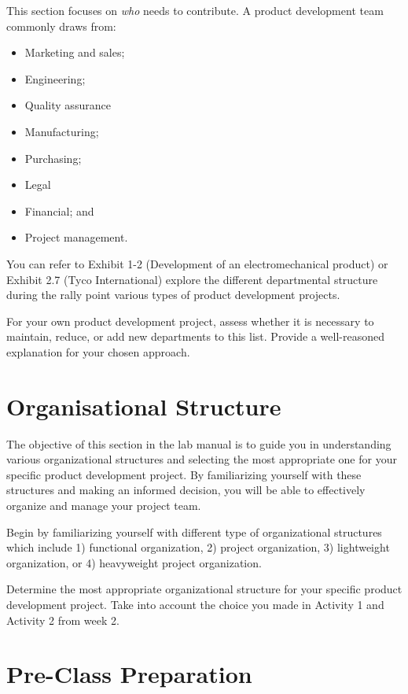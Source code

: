 This section focuses on \emph{who} needs to contribute. A product development team commonly draws from:
\begin{itemize}
    \item Marketing and sales;
    \item Engineering;
    \item Quality assurance
    \item Manufacturing;
    \item Purchasing;
    \item Legal
    \item Financial; and
    \item Project management.
\end{itemize}

You can refer to Exhibit 1-2 (Development of an electromechanical product) or Exhibit 2.7 (Tyco International) explore the different departmental structure during the rally point various types of product development projects.


For your own product development project, assess whether it is necessary to maintain, reduce, or add new departments to this list. Provide a well-reasoned explanation for your chosen approach.




\section{Organisational Structure}

The objective of this section in the lab manual is to guide you in understanding various organizational structures and selecting the most appropriate one for your specific product development project. By familiarizing yourself with these structures and making an informed decision, you will be able to effectively organize and manage your project team.

Begin by familiarizing yourself with different type of organizational structures which include 1) functional organization, 2) project organization, 3) lightweight organization, or 4) heavyweight project organization.

Determine the most appropriate organizational structure for your specific product development project. Take into account the choice you made in Activity 1 and Activity 2 from week 2.


\section{Pre-Class Preparation}

